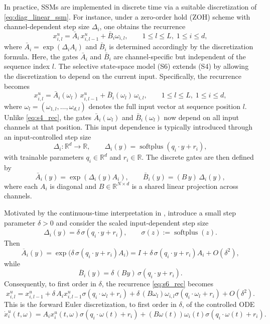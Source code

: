 \documentclass[11pt]{amsart}
\numberwithin{equation}{section} %
\theoremstyle{remark}
\begin{document}
In practice, SSMs are implemented in discrete time via a suitable discretization of \eqref{eq:diag_linear_ssm}. For instance, under a zero-order hold (ZOH) scheme \cite[Chapter~2]{aastrom2013computer} with channel-dependent step size $\Delta_i$, one obtains the recurrence
\begin{equation}\label{eq:s4_rec}
    x_{i,l}^u = \bar{A}_i\,x_{i,l-1}^u + \bar{B}_i \omega_{i,l},
    \qquad 1 \leq l \leq L,\; 1 \leq i \leq d,
\end{equation}
where $\bar{A}_i = \exp(\Delta_i A_i)$ and $\bar{B}_i$ is determined accordingly by the discretization formula. Here, the gates $\bar{A}_i$ and $\bar{B}_i$ are channel-specific but independent of the sequence index $l$. The selective state-space model (S6) \cite{gu2024mamba,muca2024theoretical} extends (S4) by allowing the discretization to depend on the current input. Specifically, the recurrence becomes
\begin{equation}\label{eq:s6_rec}
    x_{i,l}^u =  \bar{A}_i(\omega_l)\, x_{i,l-1}^u + \bar{B}_i(\omega_l)\, \omega_{i,l},
    \qquad 1 \leq l \leq L,\; 1 \leq i \leq d,
\end{equation}
where $\omega_l = (\omega_{1,l}, \dots, \omega_{d,l})$ denotes the full input vector at sequence position $l$. Unlike \eqref{eq:s4_rec}, the gates $\bar{A}_i(\omega_l)$ and $\bar{B}_i(\omega_l)$ now depend on all input channels at that position. This input dependence is typically introduced through an input-controlled step size
\[
    \Delta_i: \mathbb{R}^d \to \mathbb{R},
    \qquad
    \Delta_i(y) = \operatorname{softplus}(q_i \cdot y + r_i),
\]
with trainable parameters $q_i \in \mathbb{R}^d$ and $r_i \in \mathbb{R}$. The discrete gates are then defined by
\[
    \bar{A}_i(y) = \exp(\Delta_i(y) A_i),
    \qquad
    \bar{B}_i(y) = (B\, y)\,\Delta_i(y),
\]
where each $A_i$ is diagonal and $B \in \mathbb{R}^{N \times d}$ is a shared linear projection across channels.

Motivated by the continuous-time interpretation in \cite{muca2024theoretical}, introduce a small step parameter $\delta>0$ and consider the scaled input-dependent step size
$$
    \Delta_i(y)
    =
    \delta\,\sigma(q_i\cdot y+r_i),
    \qquad
    \sigma(z):=\operatorname{softplus}(z).
$$
Then
$$
    \overline A_i(y)
    =
    \exp\!\bigl(\delta\,\sigma(q_i\cdot y+r_i)A_i\bigr)
    =
    I+\delta\,\sigma(q_i\cdot y+r_i)A_i+O(\delta^2),
$$
while
$$
    \overline B_i(y)
    =
    \delta\,(By)\,\sigma(q_i\cdot y+r_i).
$$
Consequently, to first order in $\delta$, the recurrence \eqref{eq:s6_rec} becomes
$$
    x_{i,l}^u
    =
    x_{i,l-1}^u
    +
    \delta\,A_i x_{i,l-1}^u
    \sigma(q_i\cdot\omega_l+r_i)
    +
    \delta\,(B\omega_l)\omega_{i,l}
    \sigma(q_i\cdot\omega_l+r_i)
    +
    O(\delta^2).
$$
This is the forward Euler discretization, to first order in $\delta$, of the controlled ODE
\begin{equation}\label{eq:cont_limit_s6}
\dot{x}_i^u(t,\omega)
=
A_i x_i^u(t,\omega)
\sigma(q_i\cdot\omega(t)+r_i)
+
(B\omega(t))\omega_i(t)
\sigma(q_i\cdot\omega(t)+r_i).
\end{equation}
\end{document}
